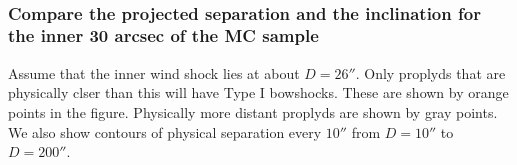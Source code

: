 \documentclass{article}
\begin{document}
    \begin{center}
    \end{center}
    { \hspace*{\fill} \\}
    
    \subsubsection{Compare the projected separation and the inclination for
the inner 30 arcsec of the MC
sample}\label{compare-the-projected-separation-and-the-inclination-for-the-inner-30-arcsec-of-the-mc-sample}

Assume that the inner wind shock lies at about $D = 26''$. Only proplyds
that are physically clser than this will have Type I bowshocks. These
are shown by orange points in the figure. Physically more distant
proplyds are shown by gray points. We also show contours of physical
separation every $10''$ from $D = 10''$ to $D = 200''$.
\end{document}
